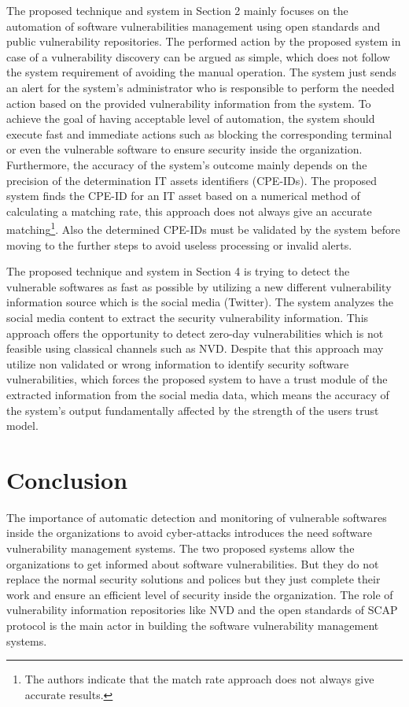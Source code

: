 \documentclass{llncs}
\begin{document}
\par The proposed technique and system in Section 2 mainly focuses on the automation of software vulnerabilities management using open standards and public vulnerability repositories. The performed action by the proposed system in case of a vulnerability discovery can be argued as simple, which does not follow the system requirement of avoiding the manual operation. The system just sends an alert for the system's administrator who is responsible to perform the needed action based on the provided vulnerability information from the system. To achieve the goal of having acceptable level of automation, the system should execute fast and immediate actions such as  blocking the corresponding terminal or even the vulnerable software  to ensure security inside the organization. Furthermore, the accuracy of the system's outcome mainly depends on the precision of the determination IT assets identifiers (CPE-IDs). The proposed system finds the CPE-ID for an IT asset based on a numerical method of calculating a matching rate, this approach does not always give an accurate matching\footnote{ The authors indicate that the match rate approach does not always give accurate results.}. Also the determined CPE-IDs must be validated by the system before moving to the further steps to avoid useless processing or invalid alerts.


\par The proposed technique and system in Section 4 is trying to detect the vulnerable softwares as fast as possible by utilizing a new different vulnerability information source which is the social media (Twitter). The system analyzes the social media content to extract the security vulnerability information. This approach offers the opportunity to detect zero-day vulnerabilities which is not feasible using classical channels such as NVD. Despite that this approach may utilize non validated or wrong information to  identify security software vulnerabilities, which forces the proposed system to  have a trust module of the extracted information from the social media data, which means the accuracy of the system's output fundamentally affected by the strength of the users trust model.
 
 \newpage  
\section{Conclusion}

\par The importance of automatic detection and monitoring of vulnerable softwares inside the organizations to avoid cyber-attacks introduces the need software vulnerability management systems. The two proposed systems allow the organizations to get informed about software vulnerabilities. But they do not replace the normal security solutions and polices but they just complete their work and ensure an efficient level of security inside the organization. The role of vulnerability information repositories like NVD and the open standards of SCAP protocol is the main actor in building the software vulnerability management systems.   
\end{document}
